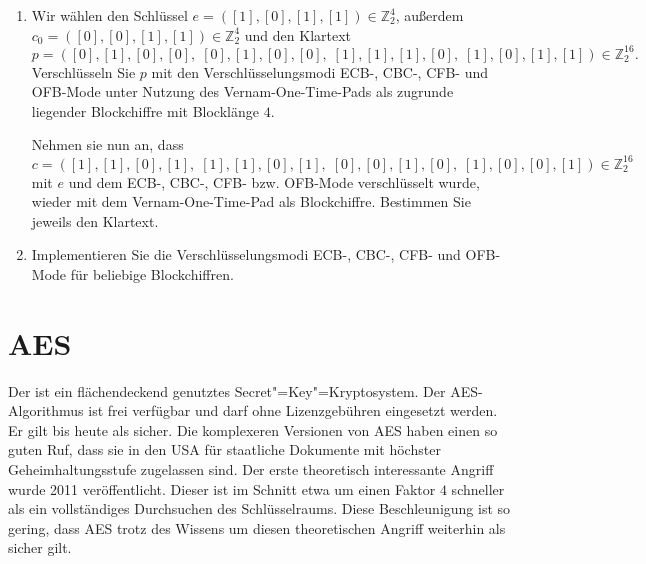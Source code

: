 \begin{exercise}
 \begin{enumerate}
  \item Wir wählen den Schlüssel $e = ([1], [0], [1], [1]) \in ℤ_2^4$, außerdem $c_{0} = ([0], [0], [1], [1]) \in ℤ_2^4$ und den Klartext
  \[p = ([0], [1], [0], [0], \; [0], [1], [0], [0], \; [1], [1], [1], [0],\; [1], [0], [1], [1]) \in ℤ_2^{16}.\]
  Verschlüsseln Sie $p$ mit den Verschlüsselungsmodi ECB-, CBC-, CFB- und OFB-Mode unter Nutzung des Vernam-One-Time-Pads als zugrunde liegender Blockchiffre mit Blocklänge $4$. 
 
  Nehmen sie nun an, dass 
  \[c = ([1], [1], [0], [1], \; [1], [1], [0], [1], \; [0], [0], [1], [0],\; [1], [0], [0], [1]) \in ℤ_2^{16}\]
  mit $e$ und dem ECB-, CBC-, CFB- bzw. OFB-Mode verschlüsselt wurde, wieder mit dem Vernam-One-Time-Pad als Blockchiffre. Bestimmen Sie jeweils den Klartext.  
  \item Implementieren Sie die Verschlüsselungsmodi ECB-, CBC-, CFB- und OFB-Mode für beliebige Blockchiffren.
 \end{enumerate}

 
\end{exercise}



\section{AES}\label{sec:AES}

Der  ist ein flächendeckend genutztes Secret"=Key"=Kryptosystem. Der AES-Algorithmus ist frei verfügbar und darf ohne Lizenzgebühren eingesetzt werden. Er gilt bis heute als sicher. Die komplexeren Versionen von AES haben einen so guten Ruf, dass sie in den USA für staatliche Dokumente mit höchster Geheimhaltungsstufe zugelassen sind. Der erste theoretisch interessante Angriff wurde 2011 veröffentlicht. Dieser ist im Schnitt etwa um einen Faktor $4$ schneller als ein vollständiges Durchsuchen des Schlüsselraums. Diese Beschleunigung ist so gering, dass AES trotz des Wissens um diesen theoretischen Angriff weiterhin als sicher gilt.


